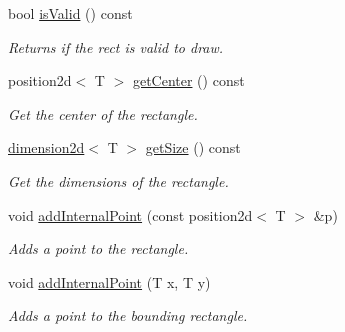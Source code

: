 \begin{DoxyCompactItemize}
bool \hyperlink{classirr_1_1core_1_1rect_ad2f5052c13cffb08f6ce8649296ec9df}{is\+Valid} () const
\begin{DoxyCompactList}\small\item\em Returns if the rect is valid to draw. \end{DoxyCompactList}\item 
\mbox{\label{classirr_1_1core_1_1rect_adf7b75a834fde75f5932f2a89a3d75cd}} 
position2d$<$ T $>$ \hyperlink{classirr_1_1core_1_1rect_adf7b75a834fde75f5932f2a89a3d75cd}{get\+Center} () const
\begin{DoxyCompactList}\small\item\em Get the center of the rectangle. \end{DoxyCompactList}\item 
\mbox{\label{classirr_1_1core_1_1rect_aa5e0bf0e6474c1603c735a63843833fa}} 
\hyperlink{classirr_1_1core_1_1dimension2d}{dimension2d}$<$ T $>$ \hyperlink{classirr_1_1core_1_1rect_aa5e0bf0e6474c1603c735a63843833fa}{get\+Size} () const
\begin{DoxyCompactList}\small\item\em Get the dimensions of the rectangle. \end{DoxyCompactList}\item 
void \hyperlink{classirr_1_1core_1_1rect_a0b7496319a32ceda640c730f5822f1ef}{add\+Internal\+Point} (const position2d$<$ T $>$ \&p)
\begin{DoxyCompactList}\small\item\em Adds a point to the rectangle. \end{DoxyCompactList}\item 
void \hyperlink{classirr_1_1core_1_1rect_a25b80222bc003a238fa8f5157bdb8b9d}{add\+Internal\+Point} (T x, T y)
\begin{DoxyCompactList}\small\item\em Adds a point to the bounding rectangle. \end{DoxyCompactList}\end{DoxyCompactItemize}
